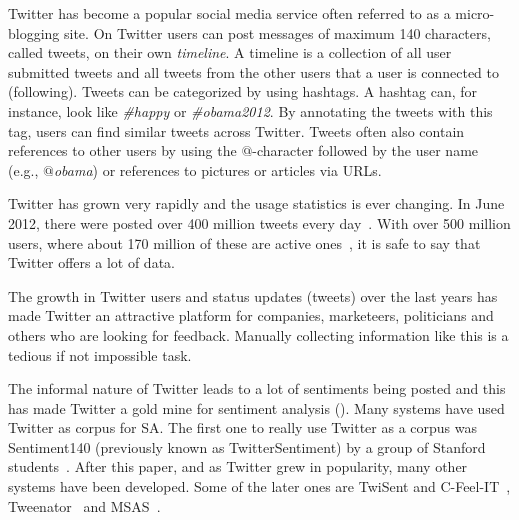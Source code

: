 Twitter has become a popular social media service often referred to as a micro-blogging site. On Twitter users can post messages of maximum 140 characters, called tweets, on their own \emph{timeline}. A timeline is a collection of all user submitted tweets and all tweets from the other users that a user is connected to (following). Tweets can be categorized by using hashtags. A hashtag can, for instance, look like \emph{\#happy} or \emph{\#obama2012}. By annotating the tweets with this tag, users can find similar tweets across Twitter. Tweets often also contain references to other users by using the $@$-character followed by the user name (e.g., \emph{$@$obama}) or references to pictures or articles via URLs.

Twitter has grown very rapidly and the usage statistics is ever changing. In June 2012, there were posted over 400 million tweets every day~\citep{site:twitterusage}. With over 500 million users, where about 170 million of these are active ones~\citep{site:users}, it is safe to say that Twitter offers a lot of data.

The growth in Twitter users and status updates (tweets) over the last years has made Twitter an attractive platform for companies, marketeers, politicians and others who are looking for feedback. Manually collecting information like this is a tedious if not impossible task.

The informal nature of Twitter leads to a lot of sentiments being posted and this has made Twitter a gold mine for sentiment analysis (). Many systems have used Twitter as corpus for SA. The first one to really use Twitter as a corpus was Sentiment140 (previously known as TwitterSentiment) by a group of Stanford students~\citep{article:go}. After this paper, and as Twitter grew in popularity, many other systems have been developed. Some of the later ones are TwiSent and C-Feel-IT~\citep{mukherjee2012twisent}, Tweenator~\citep{saif2012semantic} and MSAS~\citep{chamlertwat2012discovering}.

